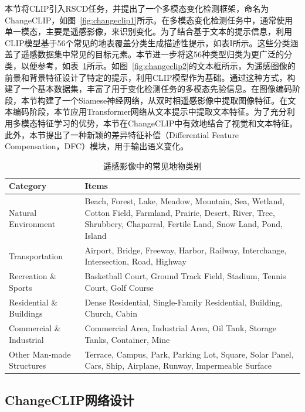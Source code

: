 本节将CLIP引入RSCD任务，并提出了一个多模态变化检测框架，命名为ChangeCLIP，如图~\ref{fig:changeclip1}所示。在多模态变化检测任务中，通常使用单一模态，主要是遥感影像，来识别变化。为了结合基于文本的提示信息，利用CLIP模型基于56个常见的地表覆盖分类生成描述性提示，如表I所示。这些分类涵盖了遥感数据集中常见的目标元素。本节进一步将这56种类型归类为更广泛的分类，以便参考，如表~\ref{tab:remote_sensing_categories}所示。如图~\ref{fig:changeclip2}的文本框所示，为遥感图像的前景和背景特征设计了特定的提示，利用CLIP模型作为基础。通过这种方式，构建了一个基本数据集，丰富了用于变化检测任务的多模态先验信息。在图像编码阶段，本节构建了一个Siamese神经网络，从双时相遥感影像中提取图像特征。在文本编码阶段，本节应用Transformer网络从文本提示中提取文本特征。为了充分利用多模态特征学习的优势，本节在ChangeCLIP中有效地结合了视觉和文本特征。此外，本节提出了一种新颖的差异特征补偿（Differential Feature Compensation，DFC）模块，用于输出语义变化。


\begin{table}[!htbp]
  \centering
  \caption{遥感影像中的常见地物类别}
  \label{tab:remote_sensing_categories}
  \begin{tabularx}{\linewidth}{@{}l X@{}}
    \toprule
    Category                      & Items \\
    \midrule
    Natural Environment           & Beach, Forest, Lake, Meadow, Mountain, Sea, Wetland, Cotton Field, Farmland, Prairie, Desert, River, Tree, Shrubbery, Chaparral, Fertile Land, Snow Land, Pond, Island \\
    \midrule
    Transportation                & Airport, Bridge, Freeway, Harbor, Railway, Interchange, Intersection, Road, Highway \\
    \midrule
    Recreation \& Sports          & Basketball Court, Ground Track Field, Stadium, Tennis Court, Golf Course \\
    \midrule
    Residential \& Buildings      & Dense Residential, Single-Family Residential, Building, Church, Cabin \\
    \midrule
    Commercial \& Industrial      & Commercial Area, Industrial Area, Oil Tank, Storage Tanks, Container, Mine \\
    \midrule
    Other Man-made Structures     & Terrace, Campus, Park, Parking Lot, Square, Solar Panel, Cars, Ship, Airplane, Runway, Impermeable Surface \\
    \bottomrule
  \end{tabularx}
\end{table}

\subsection{ChangeCLIP网络设计}
